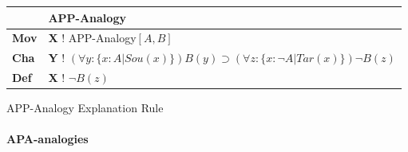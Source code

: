 					\begin{Scheme}[H]\footnotesize
               		\centering
               		\begin{tabular}{l l}
               			                   & \textbf{APP-Analogy}                                                                                                                                                                                                                                                                              \\ \toprule
               			\textbf{Mov}      & \textbf{X} ! APP-Analogy$[A,B]$                                                                                                                                                                                                                                                                                     \\ \midrule
               			\textbf{Cha} & \textbf{Y} ! $(\forall y: \{ x: A| Sou(x)\} ) B(y) \supset (\forall z : \{ x: \neg A| Tar(x)\} ) \neg B(z)$                                                                                                                                                                                                                                                                                         \\ \midrule 
               			\textbf{Def}   & \textbf{X} ! $\neg B(z)$ \\ \bottomrule
               		\end{tabular}
               		\caption{APP-Analogy Explanation Rule}
               		\label{APPAnalogyExplanation}
					\end{Scheme}
				
			\newpage		
			\paragraph{APA-analogies}
			
